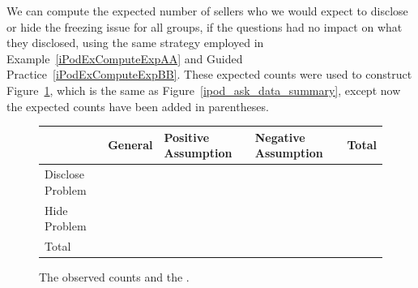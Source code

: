 We can compute the expected number of sellers who we would
expect to disclose or hide the freezing issue for all groups,
if the questions had no impact on what they disclosed,
using the same strategy employed in
Example~\ref{iPodExComputeExpAA} and
Guided Practice~\ref{iPodExComputeExpBB}.
These expected counts were used to construct Figure~\ref{ipod_ask_data_summary_expected},
which is the same as Figure~\ref{ipod_ask_data_summary},
except now the expected counts have been added in parentheses.

\begin{figure}[h]
\centering
\begin{tabular}{l lll l}
  \hline
  & General & Positive Assumption &
      Negative Assumption & Total \\ 
  \hline
  Disclose Problem &
      \iPodAA{} \ \highlightO{\footnotesize(\iPodAExpected{})} &
      \iPodAB{} \highlightO{\footnotesize(\iPodAExpected{})} &
      \iPodAC{} \highlightO{\footnotesize(\iPodAExpected{})} &
      \iPodAD{} \\ 
  Hide Problem &
      \iPodBA{} \highlightO{\footnotesize(\iPodBExpected{})} &
      \iPodBB{} \highlightO{\footnotesize(\iPodBExpected{})} &
      \iPodBC{} \highlightO{\footnotesize(\iPodBExpected{})} &
      \iPodBD{} \\ 
  \hline
  Total & \iPodDA{} & \iPodDB{} &
      \iPodDC{} & \iPodDD{} \\
  \hline
\end{tabular}
\caption{The observed counts and the
    .}
\label{ipod_ask_data_summary_expected}
\end{figure}

